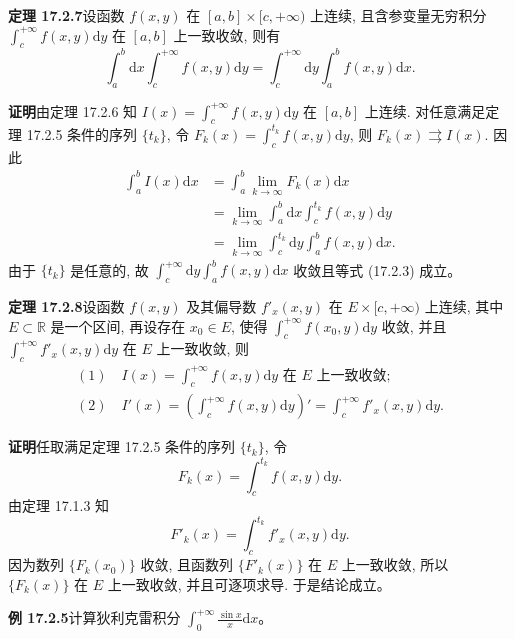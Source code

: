 \documentclass[UTF8, 12pt, fontset=fandol, oneside]{ctexart}
\begin{document}
\noindent\textbf{定理 17.2.7}\quad 设函数 $f(x,y)$ 在 $[a,b]\times[c,+\infty)$ 上连续, 且含参变量无穷积分 $\int_c^{+\infty}f(x,y)\mathrm dy$ 在 $[a,b]$ 上一致收敛, 则有
\begin{equation}
  \int_a^b\mathrm dx\int_c^{+\infty}f(x,y)\mathrm dy
  =
  \int_c^{+\infty}\mathrm dy\int_a^b f(x,y)\mathrm dx.
  \tag{17.2.3}
\end{equation}

\noindent\textbf{证明}\quad 由定理 17.2.6 知 $I(x)=\int_c^{+\infty}f(x,y)\mathrm dy$ 在 $[a,b]$ 上连续. 对任意满足定理 17.2.5 条件的序列 $\{t_k\}$, 令 $F_k(x)=\int_c^{t_k}f(x,y)\mathrm dy$, 则 $F_k(x)\rightrightarrows I(x)$. 因此
\[
\begin{aligned}
  \int_a^b I(x)\mathrm dx
  &=\int_a^b\lim_{k\to\infty}F_k(x)\mathrm dx\\
  &=\lim_{k\to\infty}\int_a^b\mathrm dx\int_c^{t_k}f(x,y)\mathrm dy\\
  &=\lim_{k\to\infty}\int_c^{t_k}\mathrm dy\int_a^b f(x,y)\mathrm dx.
\end{aligned}
\]
由于 $\{t_k\}$ 是任意的, 故 $\int_c^{+\infty}\mathrm dy\int_a^b f(x,y)\mathrm dx$ 收敛且等式 (17.2.3) 成立。

\noindent\textbf{定理 17.2.8}\quad 设函数 $f(x,y)$ 及其偏导数 $f'_x(x,y)$ 在 $E\times[c,+\infty)$ 上连续, 其中 $E\subset\mathbb R$ 是一个区间, 再设存在 $x_0\in E$, 使得 $\int_c^{+\infty}f(x_0,y)\mathrm dy$ 收敛, 并且 $\int_c^{+\infty}f'_x(x,y)\mathrm dy$ 在 $E$ 上一致收敛, 则
\[
\begin{gathered}
  (1)\quad I(x)=\int_c^{+\infty}f(x,y)\mathrm dy \text{ 在 } E \text{ 上一致收敛};\\
  (2)\quad I'(x)=\left(\int_c^{+\infty}f(x,y)\mathrm dy\right)'
  =\int_c^{+\infty}f'_x(x,y)\mathrm dy.
\end{gathered}
\]

\noindent\textbf{证明}\quad 任取满足定理 17.2.5 条件的序列 $\{t_k\}$, 令
\[
  F_k(x)=\int_c^{t_k}f(x,y)\mathrm dy.
\]
由定理 17.1.3 知
\[
  F'_k(x)=\int_c^{t_k}f'_x(x,y)\mathrm dy.
\]
因为数列 $\{F_k(x_0)\}$ 收敛, 且函数列 $\{F'_k(x)\}$ 在 $E$ 上一致收敛, 所以 $\{F_k(x)\}$ 在 $E$ 上一致收敛, 并且可逐项求导. 于是结论成立。

\noindent\textbf{例 17.2.5}\quad 计算狄利克雷积分 $\int_0^{+\infty}\frac{\sin x}{x}\mathrm dx$。
\end{document}

